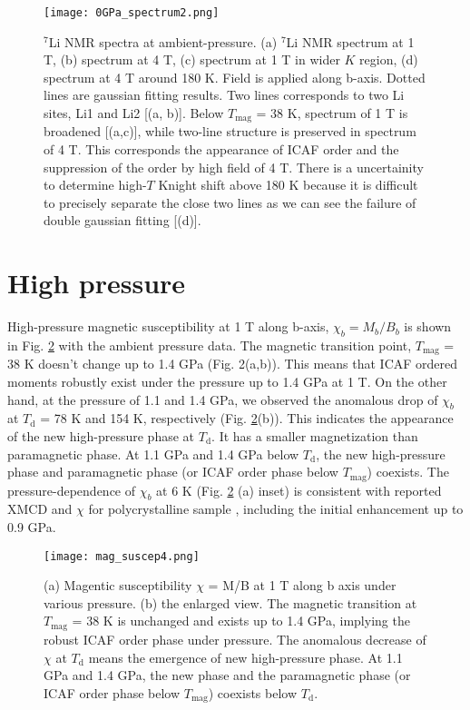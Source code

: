 \begin{figure}
  \centering
  \texttt{[image: 0GPa\_spectrum2.png]}
  \caption{${}^7$Li NMR spectra at ambient-pressure.
  (a) ${}^7$Li NMR spectrum at 1 T, (b) spectrum at 4 T, (c) spectrum at 1 T in wider $K$ region, (d) spectrum at 4 T around 180 K.
   Field is applied along b-axis.
   Dotted lines are gaussian fitting results.
  Two lines corresponds to two Li sites, Li1 and Li2 [(a, b)].
  Below $T_{\mathrm{mag}}$ = 38 K, spectrum of 1 T is broadened [(a,c)], while two-line structure is preserved in spectrum of 4 T.
  This corresponds the appearance of ICAF order and the suppression of the order by high field of 4 T.
  There is a uncertainity to determine high-$T$ Knight shift above 180 K because it is difficult to precisely separate the close two lines as we can see the failure of double
  gaussian fitting [(d)].}
  \label{0GPa_spectrum}
\end{figure}

\newpage
\section{High pressure}
High-pressure magnetic susceptibility at 1 T along b-axis, $\chi_b=M_b/B_b$ is shown in Fig. \ref{mag_suscep} with the ambient pressure data.
The magnetic transition point, $T_{\mathrm{mag}}$ = 38 K doesn't change up to 1.4 GPa (Fig. 2(a,b)).
This means that ICAF ordered moments robustly exist under the pressure up to 1.4 GPa at 1 T.
On the other hand, at the pressure of 1.1 and 1.4 GPa, we observed the anomalous drop of $\chi_b$ at $T_{\mathrm{d}}$ = 78 K and 154 K, respectively (Fig. \ref{mag_suscep}(b)).
This indicates the appearance of the new high-pressure phase at $T_{\mathrm{d}}$.
It has a smaller magnetization than paramagnetic phase.
At 1.1 GPa and 1.4 GPa below $T_{\mathrm{d}}$, the new high-pressure phase and paramagnetic phase (or ICAF order phase below $T_{\mathrm{mag}}$) coexists.
The pressure-dependence of $\chi_b$ at 6 K (Fig. \ref{mag_suscep} (a) inset) is consistent with reported XMCD \cite{takayama2015hyperhoneycomb}
and $\chi$ for polycrystalline sample \cite{Majumder2018},
including the initial enhancement up to 0.9 GPa.

\begin{figure}
  \centering
  \texttt{[image: mag\_suscep4.png]}
  \caption{(a) Magentic susceptibility $\chi$ = M/B at 1 T along b axis under various pressure.
  (b) the enlarged view. The magnetic transition at $T_{\mathrm{mag}}$ = 38 K is unchanged and exists up to 1.4 GPa, implying the robust ICAF order phase under pressure.
  The anomalous decrease of $\chi$ at $T_{\mathrm{d}}$ means the emergence of new high-pressure phase.
  At 1.1 GPa and 1.4 GPa, the new phase and the paramagnetic phase (or ICAF order phase below $T_{\mathrm{mag}}$) coexists below $T_{\mathrm{d}}$.}
  \label{mag_suscep}
\end{figure}

